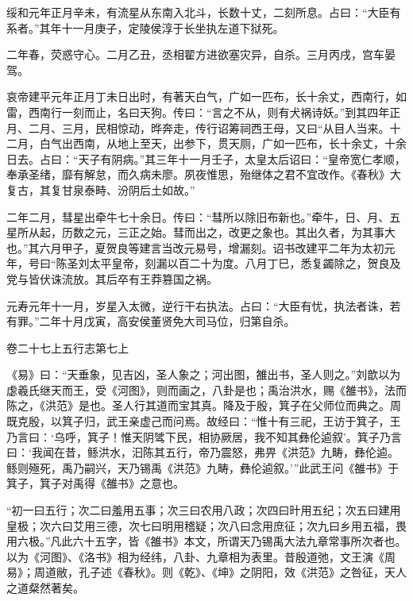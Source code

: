 \documentclass[12pt,UTF8]{ctexbook}
\begin{document}
绥和元年正月辛未，有流星从东南入北斗，长数十丈，二刻所息。占曰：“大臣有系者。”其年十一月庚子，定陵侯淳于长坐执左道下狱死。



二年春，荧惑守心。二月乙丑，丞相翟方进欲塞灾异，自杀。三月丙戌，宫车晏驾。



哀帝建平元年正月丁未日出时，有著天白气，广如一匹布，长十余丈，西南行，如雷，西南行一刻而止，名曰天狗。传曰：“言之不从，则有犬祸诗妖。”到其四年正月、二月、三月，民相惊动，晔奔走，传行诏筹祠西王母，又曰“从目人当来。十二月，白气出西南，从地上至天，出参下，贯天厕，广如一匹布，长十余丈，十余日去。占曰：“天子有阴病。”其三年十一月壬子，太皇太后诏曰：“皇帝宽仁孝顺，奉承圣绪，靡有解怠，而久病未廖。夙夜惟思，殆继体之君不宜改作。《春秋》大复古，其复甘泉泰畤、汾阴后土如故。”



二年二月，彗星出牵牛七十余日。传曰：“彗所以除旧布新也。”牵牛，日、月、五星所从起，历数之元，三正之始。彗而出之，改更之象也。其出久者，为其事大也。”其六月甲子，夏贺良等建言当改元易号，增漏刻。诏书改建平二年为太初元年，号曰“陈圣刘太平皇帝，刻漏以百二十为度。八月丁巳，悉复蠲除之，贺良及党与皆伏诛流放。其后卒有王莽篡国之祸。



元寿元年十一月，岁星入太微，逆行干右执法。占曰：“大臣有忧，执法者诛，若有罪。”二年十月戊寅，高安侯董贤免大司马位，归第自杀。





卷二十七上五行志第七上



《易》曰：“天垂象，见吉凶，圣人象之；河出图，雒出书，圣人则之。”刘歆以为虙羲氏继天而王，受《河图》，则而画之，八卦是也；禹治洪水，赐《雒书》，法而陈之，《洪范》是也。圣人行其道而宝其真。降及于殷，箕子在父师位而典之。周既克殷，以箕子归，武王亲虚己而问焉。故经曰：“惟十有三祀，王访于箕子，王乃言曰：‘乌呼，箕子！惟天阴骘下民，相协厥居，我不知其彝伦逌叙’。箕子乃言曰：‘我闻在昔，鲧洪水，汩陈其五行，帝乃震怒，弗畀《洪范》九畴，彝伦逌。鲧则殛死，禹乃嗣兴，天乃锡禹《洪范》九畴，彝伦逌叙。’”此武王问《雒书》于箕子，箕子对禹得《雒书》之意也。



“初一曰五行；次二曰羞用五事；次三曰农用八政；次四曰旪用五纪；次五曰建用皇极；次六曰艾用三德，次七曰明用稽疑；次八曰念用庶征；次九曰乡用五福，畏用六极。”凡此六十五字，皆《雒书》本文，所谓天乃锡禹大法九章常事所次者也。以为《河图》、《洛书》相为经纬，八卦、九章相为表里。昔殷道弛，文王演《周易》；周道敝，孔子述《春秋》。则《乾》、《坤》之阴阳，效《洪范》之咎征，天人之道粲然著矣。
\end{document}
